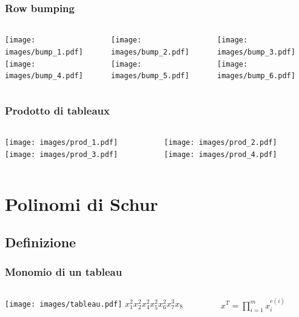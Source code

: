 \documentclass{beamer}
\begin{document}
\begin{frame}
\frametitle{Row bumping}
\centering
\begin{columns}[t]
\begin{column}{3.3cm}
\texttt{[image: images/bump\_1.pdf]}\\
\texttt{[image: images/bump\_4.pdf]}
\end{column}
\begin{column}{3.3cm}
\texttt{[image: images/bump\_2.pdf]}\\
\texttt{[image: images/bump\_5.pdf]}
\end{column}
\begin{column}{3.3cm}
\texttt{[image: images/bump\_3.pdf]}\\
\texttt{[image: images/bump\_6.pdf]}
\end{column}
\end{columns}
\end{frame}

\begin{frame}
\frametitle{Prodotto di tableaux}
\centering
\begin{columns}[t]
\begin{column}{5cm}
\texttt{[image: images/prod\_1.pdf]}\\
\texttt{[image: images/prod\_3.pdf]}
\end{column}
\begin{column}{5cm}
\texttt{[image: images/prod\_2.pdf]}\\
\texttt{[image: images/prod\_4.pdf]}
\end{column}
\end{columns}
\end{frame}


\section{Polinomi di Schur}

\subsection{Definizione}

\begin{frame}
\frametitle{Monomio di un tableau}
\centering
\begin{columns}
\begin{column}{5cm}
\texttt{[image: images/tableau.pdf]}
\Large $x_1^2 x_2^2 x_4^2 x_5^2 x_6^2 x_7^3 x_8$
\end{column}
\begin{column}{5cm}
$x^T = \prod\limits_{i = 1}^m x_i^{c(i)}$
\end{column}
\end{columns}
\end{frame}
\end{document}
